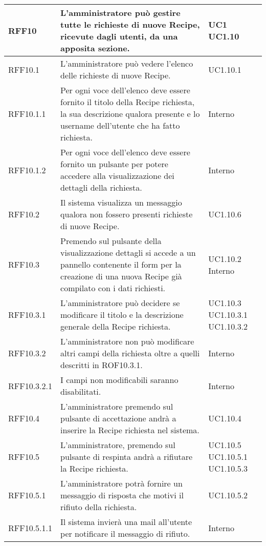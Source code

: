 \begin{center}
\begin{longtable}{| p{2.5cm} | p{8cm} | p{2cm} |}
		RFF10  &  L'amministratore può gestire tutte le richieste di nuove Recipe, ricevute dagli utenti, da una apposita sezione.  & UC1 \newline UC1.10 \\
		\hline
		RFF10.1  &  L'amministratore può vedere l'elenco delle richieste di nuove Recipe.  & UC1.10.1 \\
		\hline
		RFF10.1.1  &  Per ogni voce dell'elenco deve essere fornito il titolo della Recipe richiesta, la sua descrizione qualora presente e lo username dell'utente che ha fatto richiesta.  & Interno \\
		\hline
		RFF10.1.2  &  Per ogni voce dell'elenco deve essere fornito un pulsante per potere accedere alla visualizzazione dei dettagli della richiesta.  & Interno \\
		\hline
		RFF10.2  &  Il sistema visualizza un messaggio qualora non fossero presenti richieste di nuove Recipe.  & UC1.10.6 \\
		\hline
		RFF10.3  &  Premendo sul pulsante della visualizzazione dettagli si accede a un pannello contenente il form per la creazione di una nuova Recipe già compilato con i dati richiesti.  &  UC1.10.2 \newline Interno \\
		\hline
		RFF10.3.1  &  L'amministratore può decidere se modificare il titolo e la descrizione generale della Recipe richiesta.  & UC1.10.3 \newline UC1.10.3.1 \newline UC1.10.3.2 \\
		\hline
		RFF10.3.2  &  L'amministratore non può modificare altri campi della richiesta oltre a quelli descritti in ROF10.3.1.  & Interno \\
		\hline
		RFF10.3.2.1  &  I campi non modificabili saranno disabilitati.  & Interno \\
		\hline
		RFF10.4  &  L'amministratore premendo sul pulsante di accettazione andrà a inserire la Recipe richiesta nel sistema.  & UC1.10.4 \\
		\hline
		RFF10.5  &  L'amministratore, premendo sul pulsante di respinta andrà a rifiutare la Recipe richiesta.  & UC1.10.5 \newline UC1.10.5.1 \newline UC1.10.5.3 \\
		\hline
		RFF10.5.1  &  L'amministratore potrà fornire un messaggio di risposta che motivi il rifiuto della richiesta.  & UC1.10.5.2 \\
		\hline
		RFF10.5.1.1  &  Il sistema invierà una mail all'utente per notificare il messaggio di rifiuto.  &  Interno \\
		\hline


\end{longtable}
\end{center}
